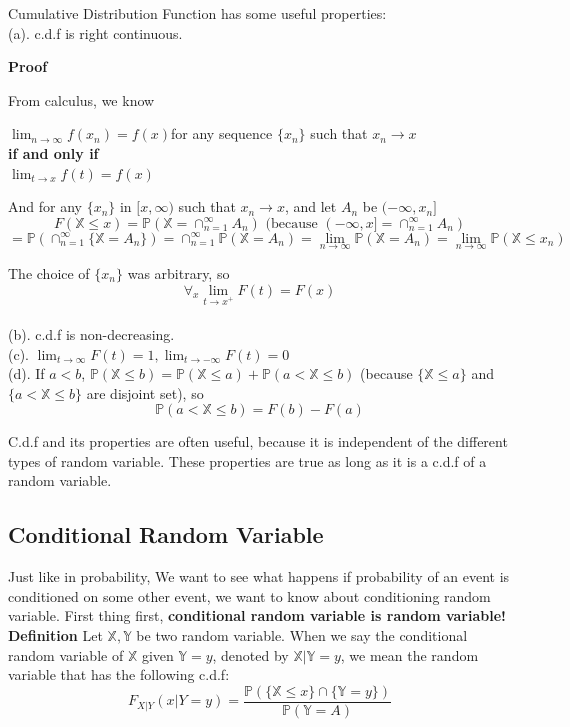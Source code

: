 \documentclass[a4paper,12pt]{article}
\begin{document}
Cumulative Distribution Function has some useful properties:\\
(a). c.d.f is right continuous.

\textbf{Proof}

From calculus, we know
\begin{center}
 $\lim_{n\to\infty}f(x_n)=f(x) $for any sequence $\{x_n\}$ such that $x_n \to x$\\ 
\textbf{if and only if}\\
 $\lim_{t\to x}f(t)=f(x)$
\end{center}
 
And for any $\{x_n\}$ in $[x, \infty )$ such that $x_n\to x$, and let $A_n$ be $(-\infty, x_n]$
$$F(\mathbb{X}\leq x) = \mathbb{P}( \mathbb{X} = \cap_{n=1}^\infty A_n )
 \text{\ \ \ (because   } (-\infty, x] = \cap_{n=1}^\infty A_n )$$
$$= \mathbb{P}(\cap_{n=1}^\infty\{\mathbb{X} = A_n \}) = \cap_{n=1}^\infty\mathbb{P}(\mathbb{X} = A_n ) = \lim_{n\to\infty}\mathbb{P}(\mathbb{X} = A_n ) = \lim_{n\to\infty}\mathbb{P}(\mathbb{X} \leq x_n )$$

The choice of $\{x_n\}$ was arbitrary, so $$\forall_x \lim_{t\to x^+}F(t) = F(x)$$\\
(b). c.d.f is non-decreasing.\\
(c). $\lim_{t\to \infty}F(t) = 1, \lim_{t\to -\infty}F(t) = 0$\\
(d). If $a<b$, $\mathbb{P}( \mathbb{X}\leq b ) = \mathbb{P}( \mathbb{X} \leq a ) + \mathbb{P}( a < \mathbb{X} \leq b )$ (because $\{\mathbb{X}\leq a\}$ and $\{a<\mathbb{X}\leq b\}$ are disjoint set), so $$\mathbb{P}( a < \mathbb{X} \leq b ) = F(b) - F(a)$$

C.d.f and its properties are often useful, because it is independent of the different types of random variable. These properties are true as long as it is a c.d.f of a random variable.

\subsection{Conditional Random Variable}
Just like in probability, We want to see what happens if probability of an event is conditioned on some other event, we want to know about conditioning random variable.
First thing first, \textbf{conditional random variable is random variable!}\\

\textbf{Definition} Let $\mathbb{X}, \mathbb{Y}$ be two random variable. When we say the conditional random variable of $\mathbb{X}$ given $\mathbb{Y} = y$, denoted by $\mathbb{X}|{\mathbb{Y}=y} $, we mean the random variable that has the following c.d.f:
$$F_{X|Y}(x|Y=y) = \frac{\mathbb{P}( \{\mathbb{X} \leq x\} \cap \{\mathbb{Y} = y\} )}{\mathbb{P}(\mathbb{Y} = A)} $$
\end{document}
